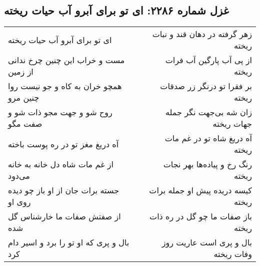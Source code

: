 \begin{center}
\section*{غزل شماره ۲۲۸۶: ای تو برای آبرو آب حیات ریخته}
\label{sec:2286}
\begin{longtable}{l p{0.5cm} r}
ای تو برای آبرو آب حیات ریخته
&&
زهر گرفته در دهان قند و نبات ریخته
\\
مست و خراب این چنین چرخ ندانی از زمین
&&
از پی آب پارگین آب فرات ریخته
\\
همچو خران به کاه و جو نیست روا چنین مرو
&&
بر فقرا تو درنگر زر صدقات ریخته
\\
روح شو و جهت مجو ذات شو و صفت مگو
&&
زان شه بی‌جهت نگر جمله جهات ریخته
\\
آه دریغ مغز تو در ره پوست باخته
&&
آه دریغ شاه تو در غم مات ریخته
\\
از غم مات شاه دل خانه به خانه می‌دود
&&
رنگ رخ و پیاده‌ها بهر نجات ریخته
\\
جسته برات جان از او باز چو دیده روی او
&&
کیسه دریده پیش او جمله برات ریخته
\\
از صفتش صفات ما خارشناس گل شده
&&
باز صفات ما چو گل در ره ذات ریخته
\\
بال و پری که او تو را برد و اسیر دام کرد
&&
بال و پری است عاریت روز وفات ریخته
\\
\end{longtable}
\end{center}
